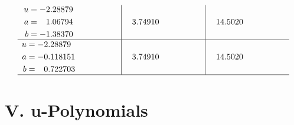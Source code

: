\documentclass[1p]{elsarticle_modified}
\theoremstyle{definition}
\begin{document}
$$\begin{array}{c|c|c}
\begin{aligned}
u &= -2.28879\phantom{ +0.000000I} \\
a &= \phantom{-}1.06794\phantom{ +0.000000I} \\
b &= -1.38370\phantom{ +0.000000I}\end{aligned}
 & \phantom{-}3.74910\phantom{ +0.000000I} & \phantom{-}14.5020\phantom{ +0.000000I} \\ \hline\begin{aligned}
u &= -2.28879\phantom{ +0.000000I} \\
a &= -0.118151\phantom{ +0.000000I} \\
b &= \phantom{-}0.722703\phantom{ +0.000000I}\end{aligned}
 & \phantom{-}3.74910\phantom{ +0.000000I} & \phantom{-}14.5020\phantom{ +0.000000I}\\
 \hline 
 \end{array}$$\newpage
\newpage\renewcommand{\arraystretch}{1}
\centering \section*{ V. u-Polynomials}
\end{document}
